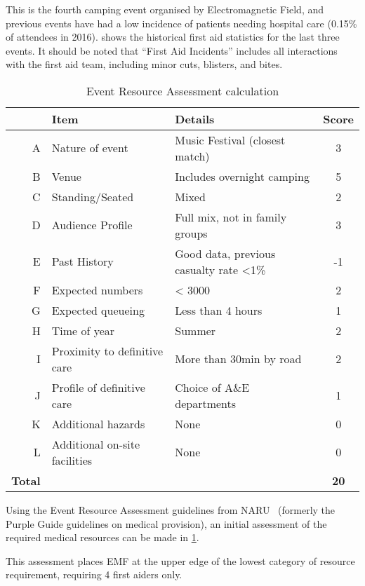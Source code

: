 This is the fourth camping event organised by Electromagnetic Field, and previous
events have had a low incidence of patients needing hospital care (0.15\% of
attendees in 2016).  shows the historical first aid
statistics for the last three events. It should be noted that ``First Aid Incidents''
includes all interactions with the first aid team, including minor cuts, blisters,
and bites.

\begin{table}[h!]
    \caption{Event Resource Assessment calculation}
    \label{table:narucalc}
    \centering
    \begin{tabular}{| r l l c |}
        \hline
           & \textbf{Item} & \textbf{Details} & \textbf{Score} \\
        \hline
        A & Nature of event & Music Festival (closest match) & 3 \\
          B & Venue & Includes overnight camping & 5 \\
          C & Standing/Seated & Mixed & 2 \\
          D & Audience Profile & Full mix, not in family groups & 3 \\
          E & Past History & Good data, previous casualty rate <1\% & -1 \\
          F & Expected numbers & < 3000 & 2 \\
          G & Expected queueing & Less than 4 hours & 1 \\
          H & Time of year & Summer & 2 \\
          I & Proximity to definitive care & More than 30min by road & 2 \\
          J & Profile of definitive care & Choice of A\&E departments & 1 \\
          K & Additional hazards & None & 0 \\
          L & Additional on-site facilities & None & 0 \\
          \textbf{Total} & & & \textbf{20} \\
        \hline
    \end{tabular}
\end{table}

Using the Event Resource Assessment guidelines from NARU~\cite{naru} (formerly
the Purple Guide guidelines on medical provision), an initial assessment of the
required medical resources can be made in \cref{table:narucalc}.

This assessment places EMF at the upper edge of the lowest category of resource
requirement, requiring 4 first aiders only.

